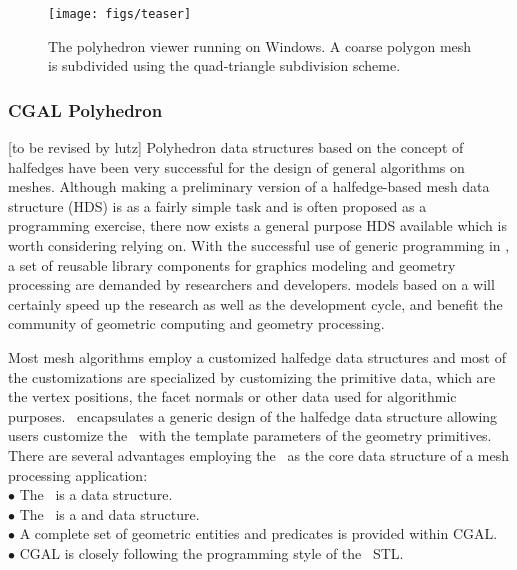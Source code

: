 \documentclass[letter,twocolumn]{article}
\begin{document}
\begin{figure}[htb]
  \centering
  \texttt{[image: figs/teaser]}
  \caption{The polyhedron viewer running on Windows. A coarse polygon 
    mesh is subdivided using the quad-triangle subdivision scheme.}
  \label{fig:viewer}
\end{figure}


\subsubsection*{CGAL Polyhedron}
[to be revised by lutz]
Polyhedron data structures based on the concept of halfedges have been
very successful for the design of general algorithms on meshes.
Although making a preliminary version of a halfedge-based mesh data
structure (HDS) is as a fairly simple task and is often proposed as a
programming exercise, there now exists a general purpose HDS available
which is worth considering relying on. With the successful use of
generic programming in \CC , a set of reusable library components for
graphics modeling and geometry processing are demanded by researchers
and developers.  models based on a
will certainly speed up the research as well as the development cycle,
and benefit the community of geometric computing and geometry
processing.

Most mesh algorithms employ a customized halfedge data structures and
most of the customizations are specialized by customizing the
primitive data, which are the vertex positions, the facet normals or
other data used for algorithmic purposes. \cgalpoly\ encapsulates a
generic design of the halfedge data structure allowing users customize
the \poly\ with the template parameters of the geometry
primitives. There are several advantages employing the \poly\ as the
core data structure of a mesh processing application: \\

\indent $\bullet$ The \poly\ is a  data structure.\\
\indent $\bullet$ The \poly\ is a  and  
                  data structure.\\
\indent $\bullet$ A complete set of geometric entities and predicates
                  is provided within CGAL.\\
\indent $\bullet$ CGAL is closely following the programming 
                  style of the \CC\ STL.
\end{document}
